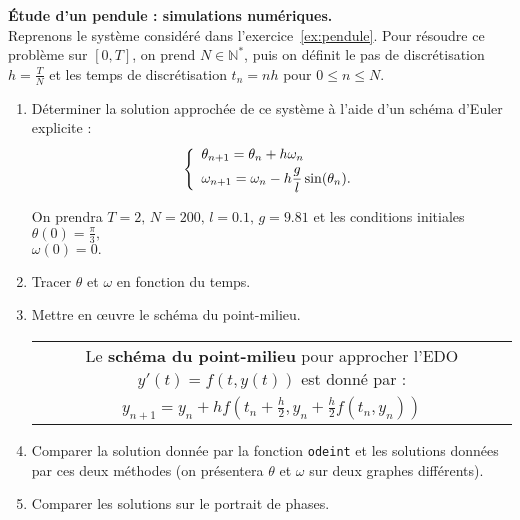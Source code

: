 \documentclass[12pt]{article}
\begin{document}
\newpage
\begin{exo}\textbf{\'Etude d'un pendule : simulations num\'eriques.}
  \label{ex:pt_milieu}
  \\
  Reprenons le syst\`eme consid\'er\'e dans l'exercice~\ref{ex:pendule}.
Pour r\'esoudre ce probl\`eme sur $[0,T]$, on prend $N \in \mathbb{N}^*$, puis on d\'efinit le pas de discr\'etisation $h=\frac TN$ et  les temps de discr\'etisation $t_n=nh$ pour $0 \leq n \leq N$.  


\begin{enumerate}
\item D\'eterminer la solution approch\'ee de ce syst\`eme \`a l'aide d'un sch\'ema d'Euler explicite :
\begin{equation*}
\left\{
\begin{array}{l}
\theta_{n+1}=\theta_n+h\omega_{n}\vspace{0.1cm}\\
\omega_{n+1}=\omega_n-h\displaystyle\frac{g}{l}\sin(\theta_{n}).
\end{array}
\right.
\end{equation*}

On prendra $T=2,\, N=200,\,l=0.1,\,g=9.81$
et les conditions initiales 
$\theta(0)=\frac{\pi}{3},\,$ \\ $\omega(0)=0.$
\item Tracer $\theta$ et $\omega$ en fonction du temps.
\item Mettre en \oe uvre le sch\'ema du point-milieu. \vspace{0.2cm}\\
\begin{tabular}{|c|}
 \hline
Le \textbf{sch\'ema du point-milieu} pour approcher l'EDO $y'(t)=f(t,y(t))$ est donn\'e par :\\
$y_{n+1}=y_n+h f\displaystyle\left(t_n+\frac h2,y_n+\frac h2 f(t_n,y_n)\right)$\\
 \hline
\end{tabular}
\item Comparer  la solution donn\'ee par la fonction \texttt{odeint} et les solutions donn\'ees par ces deux méthodes (on pr\'esentera $\theta$ et $\omega$ sur deux graphes diff\'erents). 
\item Comparer les solutions sur le portrait de phases. 
\end{enumerate}



 
\end{exo}
\end{document}
